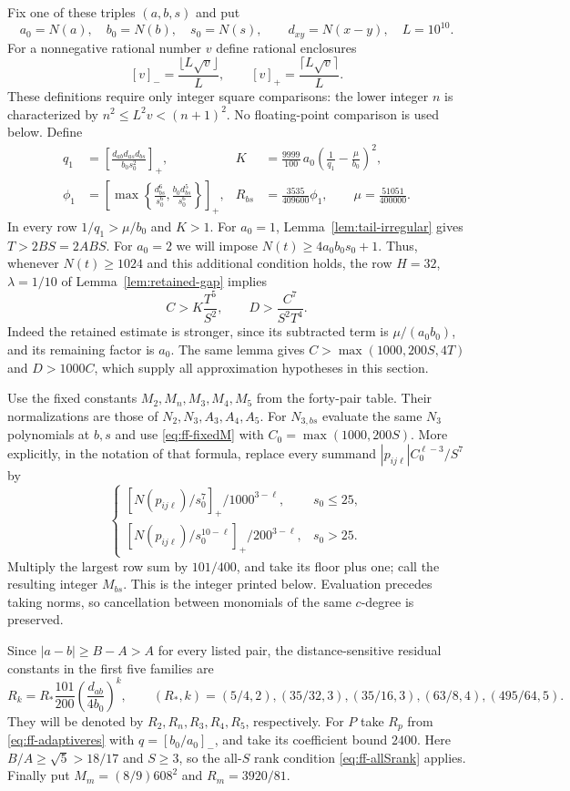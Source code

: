 \documentclass[12pt]{article}
\numberwithin{equation}{section}
\begin{document}
Fix one of these triples $(a,b,s)$ and put
\[
 a_0=N(a),\quad b_0=N(b),\quad s_0=N(s),\qquad
 d_{xy}=N(x-y),\quad L=10^{10}.
\]
For a nonnegative rational number $v$ define rational enclosures
\[
 [v]_- =\frac{\lfloor L\sqrt v\rfloor}{L},\qquad
 [v]_+ =\frac{\lceil L\sqrt v\rceil}{L}.
\]
These definitions require only integer square comparisons: the lower
integer $n$ is characterized by $n^2\le L^2v<(n+1)^2$.
No floating-point comparison is used below. Define
\begin{align*}
 q_1&=\left[\frac{d_{ab}d_{as}d_{bs}}{b_0s_0^2}\right]_+,
 &K&=\frac{9999}{100}\,a_0
       \left(\frac1{q_1}-\frac{\mu}{b_0}\right)^2,\\
 \phi_1&=\left[\max\left\{\frac{d_{bs}^6}{s_0^6},
                  \frac{b_0d_{bs}^5}{s_0^6}\right\}\right]_+,
 &R_{bs}&=\frac{3535}{409600}\phi_1,
 \qquad \mu=\frac{51051}{400000}.
\end{align*}
In every row $1/q_1>\mu/b_0$ and $K>1$.
For $a_0=1$, Lemma~\ref{lem:tail-irregular} gives $T>2BS=2ABS$.
For $a_0=2$ we will impose $N(t)\ge4a_0b_0s_0+1$.
Thus, whenever $N(t)\ge1024$ and this additional condition holds,
the row $H=32$, $\lambda=1/10$ of Lemma~\ref{lem:retained-gap}
implies
\begin{equation}\label{eq:fixed56-gap}
 C>K\frac{T^5}{S^2},\qquad
 D>\frac{C^7}{S^2T^4}.
\end{equation}
Indeed the retained estimate is stronger, since its subtracted term
is $\mu/(a_0b_0)$, and its remaining factor is $a_0$.
The same lemma gives $C>\max(1000,200S,4T)$ and $D>1000C$,
which supply all approximation hypotheses in this section.

Use the fixed constants $M_2,M_n,M_3,M_4,M_5$ from the forty-pair
table. Their normalizations are those of $N_2,N_3,A_3,A_4,A_5$.
For $N_{3,bs}$ evaluate the same $N_3$ polynomials at $b,s$ and use
\eqref{eq:ff-fixedM} with $C_0=\max(1000,200S)$.
More explicitly, in the notation of that formula, replace every
summand $|p_{ij\ell}|C_0^{\ell-3}/S^7$ by
\[
 \begin{cases}
 [N(p_{ij\ell})/s_0^7]_+/1000^{3-\ell},&s_0\le25,\\
 [N(p_{ij\ell})/s_0^{10-\ell}]_+/200^{3-\ell},&s_0>25.
 \end{cases}
\]
Multiply the largest row sum by $101/400$, and take its floor plus
one; call the resulting integer $M_{bs}$.
This is the integer printed below. Evaluation precedes taking norms,
so cancellation between monomials of the same $c$-degree is preserved.

Since $|a-b|\ge B-A>A$ for every listed pair, the distance-sensitive
residual constants in the first five families are
\begin{equation}\label{eq:fixed56-residual}
 R_k=R_*\frac{101}{200}\left(\frac{d_{ab}}{4b_0}\right)^k,
 \qquad (R_*,k)=
 (5/4,2),(35/32,3),(35/16,3),(63/8,4),(495/64,5).
\end{equation}
They will be denoted by $R_2,R_n,R_3,R_4,R_5$, respectively.
For $P$ take $R_p$ from \eqref{eq:ff-adaptiveres} with
$q=[b_0/a_0]_-$, and take its coefficient bound $2400$.
Here $B/A\ge\sqrt5>18/17$ and $S\ge3$, so the all-$S$ rank
condition \eqref{eq:ff-allSrank} applies.
Finally put $M_m=(8/9)608^2$ and $R_m=3920/81$.
\end{document}
